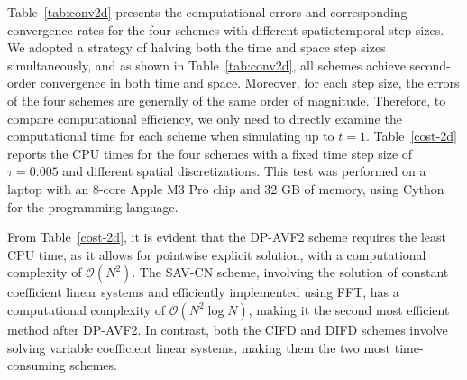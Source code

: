 \documentclass[fleqn,11pt]{elsarticle}
\numberwithin{equation}{section}
\begin{document}
Table~\ref{tab:conv2d} presents the computational errors and corresponding convergence rates for the four schemes with different spatiotemporal step sizes. We adopted a strategy of halving both the time and space step sizes simultaneously, and as shown in Table~\ref{tab:conv2d}, all schemes achieve second-order convergence in both time and space. Moreover, for each step size, the errors of the four schemes are generally of the same order of magnitude. Therefore, to compare computational efficiency, we only need to directly examine the computational time for each scheme when simulating up to $ t = 1 $. Table~\ref{cost-2d} reports the CPU times for the four schemes with a fixed time step size of $ \tau = 0.005 $ and different spatial discretizations. This test was performed on a laptop with an 8-core Apple M3 Pro chip and 32 GB of memory, using Cython for the programming language.

From Table~\ref{cost-2d}, it is evident that the DP-AVF2 scheme requires the least CPU time, as it allows for pointwise explicit solution, with a computational complexity of $ \mathcal{O}(N^2) $. The SAV-CN scheme, involving the solution of constant coefficient linear systems and efficiently implemented using FFT, has a computational complexity of $ \mathcal{O}(N^2 \log N) $, making it the second most efficient method after DP-AVF2. In contrast, both the CIFD and DIFD schemes involve solving variable coefficient linear systems, making them the two most time-consuming schemes. 
\end{document}
